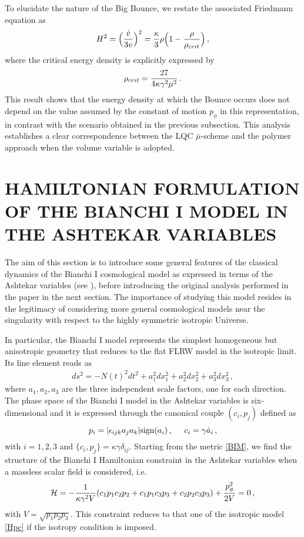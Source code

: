 \documentclass[aps,prd,twocolumn,nofootinbib,superscriptaddress]{revtex4-2}
\newcommand{\sign}{\text{sign}}
\begin{document}
To elucidate the nature of the Big Bounce, we restate the associated Friedmann equation as
\begin{equation}
	\label{FRWfrie}
	H^{2}=\Big({\dot v\over 3v} \Big)^{2}={\kappa\over3}\rho\Big(1-{\rho\over\rho_{crit}} \Big)\,,
\end{equation}
where the critical energy density is explicitly expressed by	\begin{equation} \rho_{crit}={27\over{4\kappa\gamma^{2}\mu^2}}\,.
	\label{rhovFLRW}
\end{equation}
This result shows that the energy density at which the Bounce occurs does not depend on the value assumed by the constant of motion $p_\phi$ in this representation, in contrast with the scenario obtained in the previous subsection. This analysis establishes a clear correspondence between the LQC $\bar{\mu}$-scheme \cite{AshtekarI} and the polymer approach when the volume variable is adopted.

\section{HAMILTONIAN FORMULATION OF THE BIANCHI I MODEL IN THE ASHTEKAR VARIABLES\label{ham}}
The aim of this section is to introduce some general features of the classical dynamics of the Bianchi I cosmological model as expressed in terms of the Ashtekar variables (see \cite{ashtekar2009}), before introducing the original analysis performed in the paper in the next section. The importance of studying this model resides in the legitimacy of considering more general cosmological models near the singularity with respect to the highly symmetric isotropic Universe. 

In particular, the Bianchi I model represents the simplest homogeneous but anisotropic geometry that reduces to the flat FLRW model in the isotropic limit. Its line element reads as
\begin{align}\label{BIM}{ ds^{2}=-N(t)^2 dt^2+a_1^2 dx_1^2+a_2^2 dx_2^2+a_3^2 dx_3^2}\,,
\end{align}
where $a_{1}, a_{2}, a_{3}$ are the three independent scale factors, one for each direction. The phase space of the Bianchi I model in the Ashtekar variables is six-dimensional and it is expressed through the canonical couple $(c_{i},p_j)$ defined as
\begin{equation}
	p_{i}=|\epsilon_{ijk}a_{j}a_{k}|\sign(a_{i})\,, \hspace{0.5cm}c_{i}=\gamma\dot a_{i}\,,
\end{equation}
with $i=1,2,3$ and $\{c_{i},p_j\}=\kappa\gamma\delta_{ij}$.
Starting from the metric \eqref{BIM}, we find the structure of the Bianchi I Hamiltonian constraint in the Ashtekar variables when a massless scalar field is considered, i.e.
\begin{equation}
	\label{HB}
	\mathcal{H}=-{1\over{\kappa\gamma^2V}}(c_{1}p_1c_{2}p_2+c_{1}p_1c_{3}p_3+c_{2}p_2c_{3}p_3)+{p^2_\phi\over 2 V}=0\,,
\end{equation}
with $V=\sqrt{p_1p_2p_3}$. This constraint reduces to that one of the isotropic model \eqref{Hpc} if the isotropy condition is imposed.
\end{document}
